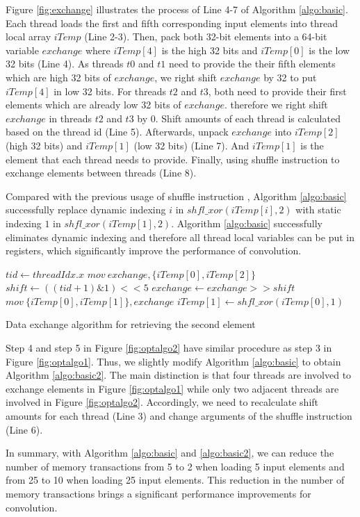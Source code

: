 \documentclass[sigplan,review,anonymous]{acmart}\settopmatter{printfolios=true,printccs=false,printacmref=false}
\begin{document}
Figure \ref{fig:exchange} illustrates the process of Line 4-7 of Algorithm \ref{algo:basic}. Each thread loads the first and fifth corresponding input elements into thread local array $iTemp$ (Line 2-3). Then, pack both 32-bit elements into a 64-bit variable $exchange$ where $iTemp[4]$ is the high 32 bits and $iTemp[0]$ is the low 32 bits (Line 4). As threads $t0$ and $t1$ need to provide the their fifth elements which are high 32 bits of $exchange$, we right shift $exchange$ by 32 to put $iTemp[4]$ in low 32 bits. For threads $t2$ and $t3$, both need to provide their first elements which are already low 32 bits of $exchange$. therefore we right shift $exchange$ in threads $t2$ and $t3$ by 0. Shift amounts of each thread is calculated based on the thread id (Line 5). Afterwards, unpack $exchange$ into $iTemp[2]$ (high 32 bits) and $iTemp[1]$ (low 32 bits) (Line 7). And $iTemp[1]$ is the element that each thread needs to provide. Finally, using shuffle instruction to exchange elements between threads (Line 8). 

Compared with the previous usage of shuffle instruction \cite{vasilache2014fast}, Algorithm \ref{algo:basic} successfully replace dynamic indexing $i$ in $shfl\_xor(iTemp[i],2)$ with static indexing $1$ in $shfl\_xor(iTemp[1],2)$.
Algorithm \ref{algo:basic} successfully eliminates dynamic indexing and therefore all thread local variables can be put in registers, which significantly improve the performance of convolution.

\begin{algorithm}
	$tid \gets threadIdx.x$\;
	$mov\ exchange, \{iTemp[0], iTemp[2]\}$\;
	$shift \gets ((tid+1)\&1)<<5$\;
	$exchange \gets exchange >> shift$\;
	$mov\ \{iTemp[0],iTemp[1]\}, exchange$\;
	$iTemp[1] \gets shfl\_xor(iTemp[0],1)$\;	
	\caption{Data exchange algorithm for retrieving the second element}
	\label{algo:basic2}
\end{algorithm}

Step 4 and step 5 in Figure \ref{fig:optalgo2} have similar procedure as step 3 in Figure \ref{fig:optalgo1}. Thus, we slightly modify Algorithm \ref{algo:basic} to obtain Algorithm \ref{algo:basic2}. The main distinction is that four threads are involved to exchange elements in Figure \ref{fig:optalgo1} while only two adjacent threads are involved in Figure \ref{fig:optalgo2}. Accordingly, we need to recalculate shift amounts for each thread (Line 3) and change arguments of the shuffle instruction (Line 6).

In summary, with Algorithm \ref{algo:basic} and \ref{algo:basic2}, we can reduce the number of memory transactions from 5 to 2 when loading 5 input elements and from 25 to 10 when loading 25 input elements. This reduction in the number of memory transactions brings a significant performance improvements for convolution. 
\end{document}
